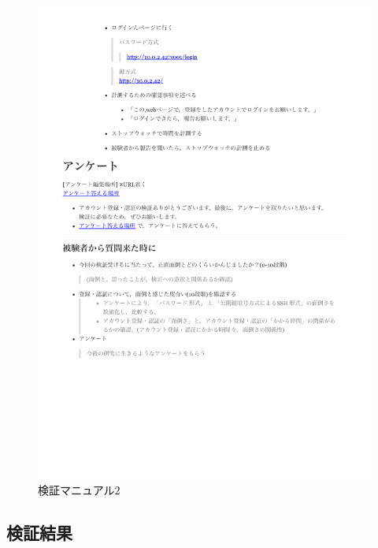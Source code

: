  \vspace{4cm}%
 \begin{figure}[H]
     \includegraphics[width=15cm]{./fig/chapter4/inspect_1/manual/manual_2.pdf}
     \caption{検証マニュアル2}
     \label{検証マニュアル２}
 \end{figure}

 \subsection{検証結果}


